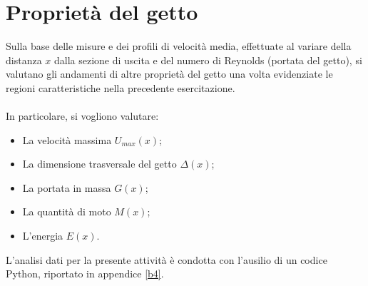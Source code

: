 \section{Proprietà del getto}
Sulla base delle misure e dei profili di velocità media, effettuate al variare della distanza $x$ dalla sezione di uscita e del numero di Reynolds (portata del getto), si valutano gli andamenti di altre proprietà del getto una volta evidenziate le regioni caratteristiche nella precedente esercitazione.\\\\
In particolare, si vogliono valutare:
\begin{itemize}
    \item La velocità massima $U_{max}(x)$;
    \item La dimensione trasversale del getto $\Delta(x)$;
    \item La portata in massa $G(x)$;
    \item La quantità di moto $M(x)$;
    \item L'energia $E(x)$.
\end{itemize}
L'analisi dati per la presente attività è condotta con l'ausilio di un codice Python, riportato in appendice \ref{b4}.

